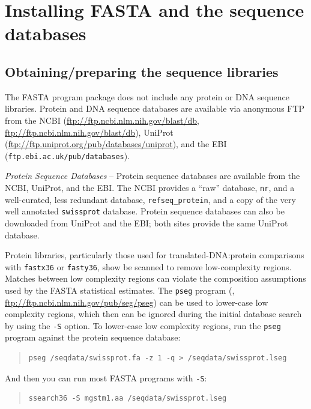 \documentclass[11pt]{article}
\begin{document}
\section{Installing FASTA and the sequence databases}

\subsection{Obtaining/preparing the sequence libraries}

The FASTA program package does not include any protein or DNA sequence
libraries.  Protein and DNA sequence databases are available via
anonymous FTP from the NCBI (\url{ftp://ftp.ncbi.nlm.nih.gov/blast/db},
\url{ftp://ftp.ncbi.nlm.nih.gov/blast/db}), UniProt
(\url{ftp://ftp.uniprot.org/pub/databases/uniprot}), and the EBI
(\texttt{ftp.ebi.ac.uk/pub/databases}).

\emph{Protein Sequence Databases} -- Protein sequence databases are
available from the NCBI, UniProt, and the EBI.  The NCBI provides a
``raw'' database, \texttt{nr}, and a well-curated, less redundant
database, \texttt{refseq\_protein}, and a copy of the very well
annotated \texttt{swissprot} database. Protein sequence databases can
also be downloaded from UniProt and the EBI; both sites provide the
same UniProt\cite{uniprot11} database.

Protein libraries, particularly those used for translated-DNA:protein
comparisons with \texttt{fastx36} or \texttt{fasty36}, show be scanned
to remove low-complexity regions.  Matches between low complexity
regions can violate the composition assumptions used by the FASTA
statistical estimates. The \texttt{pseg} program (\cite{woo935},
\url{ftp://ftp.ncbi.nlm.nih.gov/pub/seg/pseg}) can be used to lower-case
low complexity regions, which then can be ignored during the initial
database search by using the \texttt{-S} option.  To lower-case low
complexity regions, run the \texttt{pseg} program against the protein sequence database:
\begin{quote}
\begin{verbatim}
pseg /seqdata/swissprot.fa -z 1 -q > /seqdata/swissprot.lseg
\end{verbatim}
\end{quote}
And then you can run most FASTA programs with \texttt{-S}:
\begin{quote}
\begin{verbatim}
ssearch36 -S mgstm1.aa /seqdata/swissprot.lseg
\end{verbatim}
\end{quote}
\end{document}
